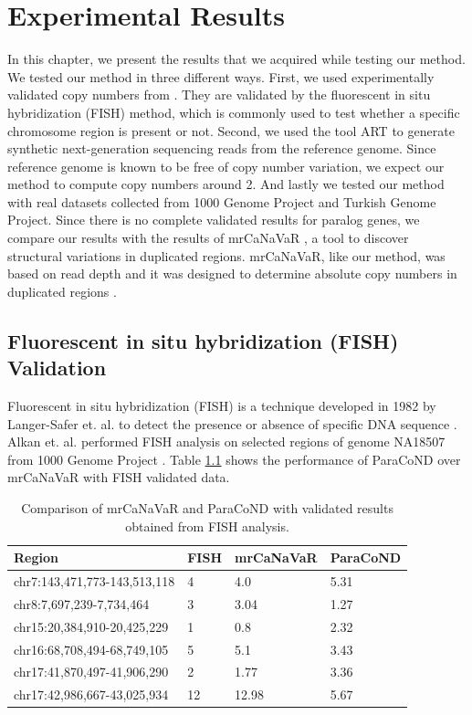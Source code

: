 \chapter{Experimental Results}

In this chapter, we present the results that we acquired while testing our method. We tested our method in three different ways. First, we used experimentally validated copy numbers from \cite{alkan2009personalized}. They are validated by the fluorescent in situ hybridization (FISH) method, which is commonly used to test whether a specific chromosome region is present or not. Second, we used the tool ART \cite{huang2011art} to generate synthetic next-generation sequencing reads from the reference genome. Since reference genome is known to be free of copy number variation, we expect our method to compute copy numbers around 2. And lastly we tested our method with real datasets collected from 1000 Genome Project and Turkish Genome Project. Since there is no complete validated results for paralog genes, we compare our results with the results of mrCaNaVaR \cite{alkan2009personalized}, a tool to discover structural variations in duplicated regions. mrCaNaVaR, like our method, was based on read depth and it was designed to determine absolute copy numbers in duplicated regions \cite{kahveci2018whole}.

\section{Fluorescent in situ hybridization (FISH) Validation}
Fluorescent in situ hybridization (FISH) is a technique developed in 1982 by Langer-Safer et. al. to detect the presence or absence of specific DNA sequence \cite{langer1982immunological}. Alkan et. al. performed FISH analysis on selected regions of genome NA18507 from 1000 Genome Project \cite{alkan2009personalized, eberle2017reference}. Table \ref{fishcomparison} shows the performance of ParaCoND over mrCaNaVaR with FISH validated data.

\begin{table}[!htbp]
\begin{tabular}{llll}
\hline
\textbf{Region}                & \textbf{FISH} & \textbf{mrCaNaVaR} & \textbf{ParaCoND} \\ \hline
chr7:143,471,773-143,513,118 & 4               & 4.0       & 5.31     \\
chr8:7,697,239-7,734,464     & 3               & 3.04      & 1.27     \\
chr15:20,384,910-20,425,229  & 1               & 0.8       & 2.32     \\
chr16:68,708,494-68,749,105  & 5               & 5.1       & 3.43     \\
chr17:41,870,497-41,906,290  & 2               & 1.77      & 3.36     \\
chr17:42,986,667-43,025,934  & 12              & 12.98     & 5.67       \\ \hline
\end{tabular}
    \caption{Comparison of mrCaNaVaR and ParaCoND with validated results obtained from FISH analysis.}
    \label{fishcomparison}
\end{table}


